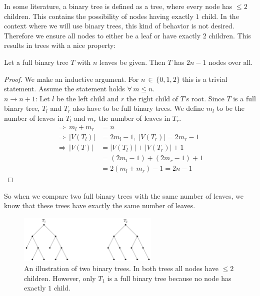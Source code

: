 \begin{rem}
In some literature, a binary tree is defined as a tree, where every node has $\leq 2$ children. This contains the possibility of nodes having exactly $1$ child. In the context where we will use binary trees, this kind of behavior is not desired. Therefore we ensure all nodes to either be a leaf or have exactly $2$ children. This results in trees with a nice property: 
\begin{lem}
Let a full binary tree $T$ with $n$ leaves be given. Then $T$ has $2n-1$ nodes over all.
\end{lem}
\begin{proof}
We make an inductive argument. For $n \, \in \, \{0,1,2\}$ this is a trivial statement. Assume the statement holds $\forall \, m \leq n$.\\
$n \to  n+1$: Let $l$ be the left child and $r$ the right child of $T$'s root. Since $T$ is a full binary tree, $T_l$ and $T_r$ also have to be full binary trees. We define $m_l$ to be the number of leaves in $T_l$ and $m_r$ the number of leaves in $T_r$. 
\begin{align*}
\Rightarrow \, m_l + m_r &= n \\
\Rightarrow \, |V(T_l)| &= 2m_l -1, \; |V(T_r)| = 2m_r - 1\\
\Rightarrow \, |V(T)| &= |V(T_l)| + |V(T_r)| + 1  \\
 \, &= (2m_l -1) + (2m_r -1) +1 \\
 \, &= 2(m_l+m_r)-1 = 2n-1 
\end{align*}
\end{proof} 
So when we compare two full binary trees with the same number of leaves, we know that these trees have exactly the same number of leaves. 
\begin{figure}[h!]
	\centering
    \includegraphics[width=0.6\textwidth]{figures/_full_binaryTrees.png}
    \captionsetup{singlelinecheck=off}
    \caption{An illustration of two binary trees. In both trees all nodes have $\leq 2$ children. However, only $T_1$ is a full binary tree because no node has exactly $1$ child.} 
\end{figure}
\end{rem}

